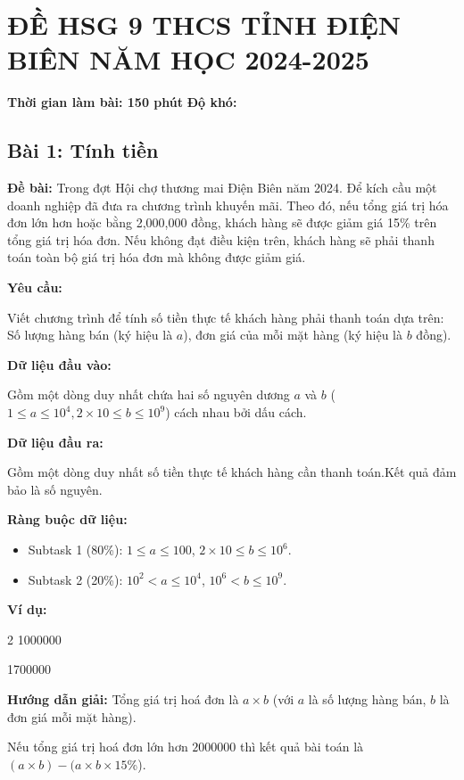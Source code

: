 \documentclass[12pt]{scrartcl}  %
\begin{document}
\section{ĐỀ HSG 9 THCS TỈNH ĐIỆN BIÊN NĂM HỌC 2024-2025}
\textbf{Thời gian làm bài: 150 phút}
\textbf{Độ khó: }
\subsection{Bài 1: Tính tiền}
\textbf{Đề bài:}
Trong đợt Hội chợ thương mai Điện Biên năm 2024. Để kích cầu một doanh nghiệp đã đưa ra chương trình khuyến mãi. Theo đó, nếu tổng giá trị hóa đơn lớn hơn hoặc bằng 2,000,000 đồng, khách hàng sẽ được giảm giá 15\% trên tổng giá trị hóa đơn. Nếu không đạt điều kiện trên, khách hàng sẽ phải thanh toán toàn bộ giá trị hóa đơn mà không được giảm giá.

\textbf{Yêu cầu:}

Viết chương trình để tính số tiền thực tế khách hàng phải thanh toán dựa trên: Số lượng hàng bán (ký hiệu là $a$), đơn giá của mỗi mặt hàng (ký hiệu là $b$ đồng).

\textbf{Dữ liệu đầu vào:}

Gồm một dòng duy nhất chứa hai số nguyên dương $a$ và $b$ ($1 \leq a \leq 10^4,2 \times 10 \leq b \leq 10^9$) cách nhau bởi dấu cách.

\textbf{Dữ liệu đầu ra:}

Gồm một dòng duy nhất số tiền thực tế khách hàng cần thanh toán.Kết quả đảm bảo là số nguyên.

\textbf{Ràng buộc dữ liệu:}
\begin{itemize}
    \item Subtask 1 (80\%): $1 \leq a \leq 100$, $2 \times 10 \leq b \leq 10^6$.
    \item Subtask 2 (20\%): $10^2 < a \leq 10^4$, $10^6 < b \leq 10^9$.
\end{itemize}

\textbf{Ví dụ:}
\begin{tcolorbox}[colback=gray!5!white, colframe=blue!50!black, title=Input]
2 1000000
\end{tcolorbox}
\begin{tcolorbox}[colback=gray!5!white, colframe=green!50!black, title=Output]
1700000
\end{tcolorbox}
\textbf{Hướng dẫn giải:} Tổng giá trị hoá đơn là $a \times b$ (với $a$ là số lượng hàng bán,
$b$ là đơn giá mỗi mặt hàng).

Nếu tổng giá trị hoá đơn lớn hơn $2000000$ thì kết quả bài toán là $(a \times b) - (a \times b \times 15$\%).
\end{document}
